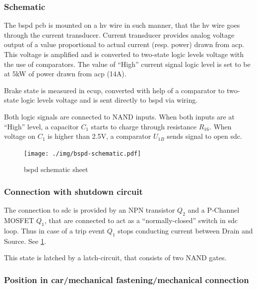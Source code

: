 \subsubsection{Schematic}
The \gls{bspd} \gls{pcb} is mounted on a \gls{hv} wire in such manner, that the \gls{hv} wire goes through the
current transducer. Current transducer provides analog voltage output of a value proportional to
actual current (resp. power) drawn from \gls{acp}. This voltage is amplified and is converted to two-state
logic levels voltage with the use of comparators. The value of “High” current signal logic level
is set to be at 5kW of power drawn from \gls{acp} (14A).

Brake state is measured in \gls{ecup}, converted with help of a comparator to two-state logic levels
voltage and is sent directly to \gls{bspd} via wiring.

Both logic signals are connected to NAND inputs. When both inputs are at “High” level, a
capacitor $C_1$ starts to charge through resistance $R_{16}$. When voltage on $C_1$ is higher than 2.5V, a
comparator $U_{1B}$ sends signal to open \gls{sdc}.

\begin{figure}[H]
	\centering
	\texttt{[image: ./img/bspd-schematic.pdf]}
	\caption{\gls{bspd} schematic sheet}
	\label{fig:BSPD-schematic}
\end{figure}

\subsubsection{Connection with shutdown circuit}
The connection to \gls{sdc} is provided by an NPN transistor $Q_2$ and a P-Channel MOSFET $Q_1$, that
are connected to act as a “normally-closed” switch in \gls{sdc} loop. Thus in case of a trip event $Q_1$
stops conducting current between Drain and Source. See \ref{fig:BSPD-schematic}.

This state is latched by a latch-circuit, that consists of two NAND gates.

\subsubsection{Position in car/mechanical fastening/mechanical connection}

